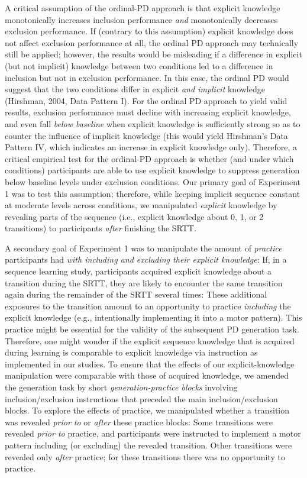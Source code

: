 \documentclass[man]{apa6}
\theoremstyle{definition}
\theoremstyle{definition}
\theoremstyle{definition}
\theoremstyle{remark}
\begin{document}
A critical assumption of the ordinal-PD approach is that explicit
knowledge monotonically increases inclusion performance \emph{and}
monotonically decreases exclusion performance. If (contrary to this
assumption) explicit knowledge does not affect exclusion performance at
all, the ordinal PD approach may technically still be applied; however,
the results would be misleading if a difference in explicit (but not
implicit) knowledge between two conditions led to a difference in
inclusion but not in exclusion performance. In this case, the ordinal PD
would suggest that the two conditions differ in explicit \emph{and
implicit} knowledge (Hirshman, 2004, Data Pattern I). For the ordinal PD
approach to yield valid results, exclusion performance must decline with
increasing explicit knowledge, and even fall \emph{below baseline} when
explicit knowledge is sufficiently strong so as to counter the influence
of implicit knowledge (this would yield Hirshman's Data Pattern IV,
which indicates an increase in explicit knowledge only). Therefore, a
critical empirical test for the ordinal-PD approach is whether (and
under which conditions) participants are able to use explicit knowledge
to suppress generation below baseline levels under exclusion conditions.
Our primary goal of Experiment 1 was to test this assumption; therefore,
while keeping implicit sequence constant at moderate levels across
conditions, we manipulated \emph{explicit} knowledge by revealing parts
of the sequence (i.e., explicit knowledge about 0, 1, or 2 transitions)
to participants \emph{after} finishing the SRTT.

A secondary goal of Experiment 1 was to manipulate the amount of
\emph{practice} participants had \emph{with including and excluding
their explicit knowledge}: If, in a sequence learning study,
participants acquired explicit knowledge about a transition during the
SRTT, they are likely to encounter the same transition again during the
remainder of the SRTT several times: These additional exposures to the
transition amount to an opportunity to practice \emph{including} the
explicit knowledge (e.g., intentionally implementing it into a motor
pattern). This practice might be essential for the validity of the
subsequent PD generation task. Therefore, one might wonder if the
explicit sequence knowledge that is acquired during learning is
comparable to explicit knowledge via instruction as implemented in our
studies. To ensure that the effects of our explicit-knowledge
manipulation were comparable with those of acquired knowledge, we
amended the generation task by short \emph{generation-practice blocks}
involving inclusion/exclusion instructions that preceded the main
inclusion/exclusion blocks. To explore the effects of practice, we
manipulated whether a transition was revealed \emph{prior to} or
\emph{after} these practice blocks: Some transitions were revealed
\emph{prior to} practice, and participants were instructed to implement
a motor pattern including (or excluding) the revealed transition. Other
transitions were revealed only \emph{after} practice; for these
transitions there was no opportunity to practice.
\end{document}
